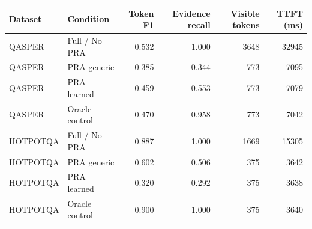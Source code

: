 \begin{tabular}{llrrrr}
\toprule
Dataset & Condition & Token F1 & Evidence recall & Visible tokens & TTFT (ms) \\
\midrule
QASPER & Full / No PRA & 0.532 & 1.000 & 3648 & 32945 \\
QASPER & PRA generic & 0.385 & 0.344 & 773 & 7095 \\
QASPER & PRA learned & 0.459 & 0.553 & 773 & 7079 \\
QASPER & Oracle control & 0.470 & 0.958 & 773 & 7042 \\
HOTPOTQA & Full / No PRA & 0.887 & 1.000 & 1669 & 15305 \\
HOTPOTQA & PRA generic & 0.602 & 0.506 & 375 & 3642 \\
HOTPOTQA & PRA learned & 0.320 & 0.292 & 375 & 3638 \\
HOTPOTQA & Oracle control & 0.900 & 1.000 & 375 & 3640 \\
\bottomrule
\end{tabular}
